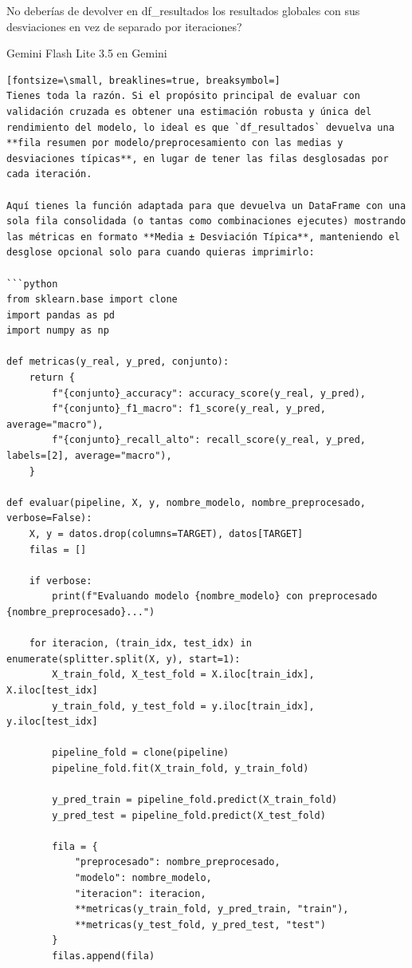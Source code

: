 \documentclass[12pt,a4paper,oneside]{book}
\begin{document}
\begin{iaprompt}
No deberías de devolver en df\_resultados los resultados globales con sus desviaciones en vez de separado por iteraciones?
\end{iaprompt}
\begin{iaresp}{Gemini Flash Lite 3.5 en Gemini}
\begin{Verbatim}[fontsize=\small, breaklines=true, breaksymbol=]
Tienes toda la razón. Si el propósito principal de evaluar con validación cruzada es obtener una estimación robusta y única del rendimiento del modelo, lo ideal es que `df_resultados` devuelva una **fila resumen por modelo/preprocesamiento con las medias y desviaciones típicas**, en lugar de tener las filas desglosadas por cada iteración.

Aquí tienes la función adaptada para que devuelva un DataFrame con una sola fila consolidada (o tantas como combinaciones ejecutes) mostrando las métricas en formato **Media ± Desviación Típica**, manteniendo el desglose opcional solo para cuando quieras imprimirlo:

```python
from sklearn.base import clone
import pandas as pd
import numpy as np

def metricas(y_real, y_pred, conjunto):
    return {
        f"{conjunto}_accuracy": accuracy_score(y_real, y_pred),
        f"{conjunto}_f1_macro": f1_score(y_real, y_pred, average="macro"),
        f"{conjunto}_recall_alto": recall_score(y_real, y_pred, labels=[2], average="macro"),
    }

def evaluar(pipeline, X, y, nombre_modelo, nombre_preprocesado, verbose=False):
    X, y = datos.drop(columns=TARGET), datos[TARGET]
    filas = []
    
    if verbose:
        print(f"Evaluando modelo {nombre_modelo} con preprocesado {nombre_preprocesado}...")
        
    for iteracion, (train_idx, test_idx) in enumerate(splitter.split(X, y), start=1):
        X_train_fold, X_test_fold = X.iloc[train_idx], X.iloc[test_idx]
        y_train_fold, y_test_fold = y.iloc[train_idx], y.iloc[test_idx]
        
        pipeline_fold = clone(pipeline)
        pipeline_fold.fit(X_train_fold, y_train_fold)
        
        y_pred_train = pipeline_fold.predict(X_train_fold)
        y_pred_test = pipeline_fold.predict(X_test_fold)
        
        fila = {
            "preprocesado": nombre_preprocesado,
            "modelo": nombre_modelo, 
            "iteracion": iteracion,
            **metricas(y_train_fold, y_pred_train, "train"),
            **metricas(y_test_fold, y_pred_test, "test")
        }
        filas.append(fila)
        

\end{Verbatim}
\end{iaresp}
\end{document}
